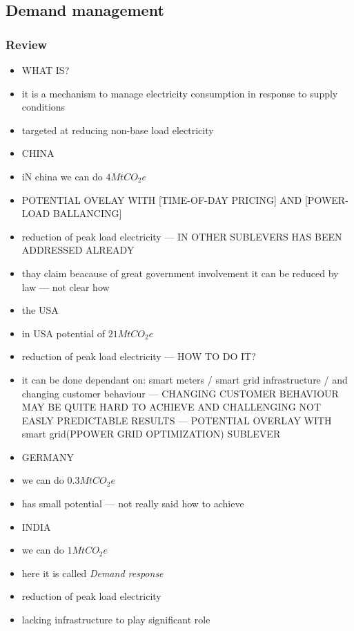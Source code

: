 \documentclass[11pt, twocolumn]{article}
\begin{document}
\subsection{Demand management}
\subsubsection{Review}
\begin{itemize}
\item WHAT IS?
\item it is a mechanism to manage electricity consumption in response to supply conditions
\item targeted at reducing non-base load electricity

\item CHINA
\item iN china we can do $4 Mt CO_2e$
\item POTENTIAL OVELAY WITH [TIME-OF-DAY PRICING] AND [POWER-LOAD BALLANCING]
\item reduction of peak load electricity --- IN OTHER SUBLEVERS HAS BEEN ADDRESSED ALREADY
\item thay claim beacause of great government involvement it can be reduced by law --- not clear how

\item the USA
\item in USA potential of $21 MtCO_2e$
\item reduction of peak load electricity --- HOW TO DO IT?
\item it can be done dependant on: smart meters / smart grid infrastructure / and changing customer behaviour --- CHANGING CUSTOMER BEHAVIOUR MAY BE QUITE HARD TO ACHIEVE AND CHALLENGING NOT EASLY PREDICTABLE RESULTS --- POTENTIAL OVERLAY WITH smart grid(PPOWER GRID OPTIMIZATION) SUBLEVER

\item GERMANY
\item we can do $0.3 Mt CO_2e$
\item has small potential --- not really said how to achieve

\item INDIA
\item we can do $1 Mt CO_2e$
\item here it is called \emph{Demand response}
\item reduction of peak load electricity
\item lacking infrastructure to play significant role


\end{itemize}
\end{document}
